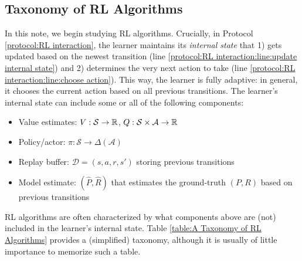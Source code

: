 \subsection{Taxonomy of RL Algorithms}
In this note, we begin studying RL algorithms.
Crucially, in Protocol \ref{protocol:RL interaction}, the learner maintains its {\em internal state} that 
1) gets updated based on the newest transition (line \ref{protocol:RL interaction:line:update internal state})
and 2) determines the very next action to take (line \ref{protocol:RL interaction:line:choose action}).
This way, the learner is fully adaptive: in general, it chooses the current action based on all previous transitions.
The learner's internal state can include some or all of the following components:
\begin{itemize}
    \item Value estimates: $V:\mathcal{S}\to\operatorname{\mathbb{R}}$, $Q:\mathcal{S}\times\mathcal{A}\to\operatorname{\mathbb{R}}$
    \item Policy/actor:  $\pi:\mathcal{S}\to\Delta(\mathcal{A})$
    \item Replay buffer: $\mathcal{D}={(s,a,r,s')}$ storing previous transitions
    \item Model estimate: $(\widehat{P}, \widehat{R})$ that estimates the ground-truth $(P,R)$ based on previous transitions
\end{itemize}
RL algorithms are often characterized by what components above are (not) included in the learner's internal state.
Table \ref{table:A Taxonomy of RL Algorithms} provides a (simplified) taxonomy, although it is usually of little importance to memorize such a table. 
